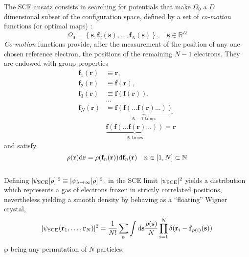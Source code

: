 \documentclass[aps,pra,twocolumn,superscriptaddress]{revtex4}
\begin{document}
The SCE ansatz consists in searching for potentials that make $\Omega_0$ a $D$ dimensional subset of the configuration space, defined by a set of \textit{co-motion} functions (or optimal maps) \citep{Sei-PRA-99,SeiGorSav-PRA-07}:
\begin{equation}\label{degenerateminimuminseidlmap}
\Omega_0=\left\lbrace\textbf{s},\textbf{f}_2(\textbf{s}),\ldots,\textbf{f}_N(\textbf{s})\right\rbrace,\quad\textbf{s}\in\mathbb{R}^D
\end{equation}
\textit{Co-motion} functions provide, after the measurement of the position of any one chosen reference electron, the positions of the remaining $N-1$ electrons. They are endowed with group properties \cite{SeiGorSav-PRA-07} 
\begin{equation}
	\label{eq:groupprop}
\begin{aligned}
\textbf{f}_1(\textbf{r})&\equiv\textbf{r},\\\textbf{f}_2(\textbf{r})&\equiv\textbf{f}(\textbf{r}),\\\textbf{f}_3(\textbf{r})&\equiv\textbf{f}(\textbf{f}(\textbf{r})),\\&\ldots\\\textbf{f}_N(\textbf{r})&=\underbrace{\textbf{f}(\textbf{f}(\ldots\textbf{f}(\textbf{r})\ldots))}_{N-1\text{ times}}\\&\underbrace{\textbf{f}(\textbf{f}(\ldots\textbf{f}(\textbf{r})\ldots))}_{N\text{ times}}=\textbf{r}
\end{aligned}
\end{equation} and satisfy
\begin{equation}\label{DifferentialEqComotionFunctions}
\rho(\textbf{r})\text{\rm{d}}\textbf{r}=\rho(\textbf{f}_n(\textbf{r}))\text{\rm{d}}\textbf{f}_n(\textbf{r})\quad n\in[1,N]\subset\mathbb{N}
\end{equation}
\\Defining $\vert\psi_{\rm{\rm{SCE}}}[\rho]\vert^2\equiv\vert\psi_{\lambda\rightarrow\infty}[\rho]\vert^2$, in the SCE limit $\vert\psi_{\rm{\rm{SCE}}}\vert^2$ yields a distribution which represents a gas of electrons frozen in strictly correlated positions, nevertheless yielding a smooth density by behaving as a ``floating'' Wigner crystal,
 \citep{SeiGorSav-PRA-07} \begin{equation}\label{SCEwf}
\vert\psi_{\rm{\rm{SCE}}}(\textbf{r}_1,\ldots,\textbf{r}_N)\vert^2=\frac{1}{N!}\sum_{\wp}\int\text{\rm{d}}\textbf{s}\frac{\rho(\textbf{s})}{N}\prod_{i=1}^N \delta(\textbf{r}_i -\textbf{f}_{\wp (i)}(\textbf{s}))
\end{equation}$\wp$ being any permutation of $N$ particles.
\end{document}
